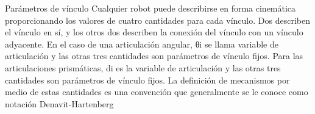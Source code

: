 \documentclass[10pt,stdletter,dateno,sigleft]{newlfm}
\date\\[04 de Octubre del 2019] %
\begin{document}
\date{FECHA 2019}
\begin{newlfm}

Parámetros de vínculo
Cualquier robot puede describirse en forma cinemática proporcionando los valores de cuatro cantidades para cada vínculo. Dos describen el vínculo en sí, y los otros dos describen la conexión del vínculo con un vínculo adyacente. En el caso de una articulación angular, θi se llama variable de articulación y las otras tres cantidades son parámetros de vínculo fijos. Para las articulaciones prismáticas, di es la variable de articulación y las otras tres cantidades son parámetros de vínculo fijos. La definición de mecanismos por medio de estas cantidades es una convención que generalmente se le conoce como notación Denavit-Hartenberg

 


\end{newlfm}
\end{document}
